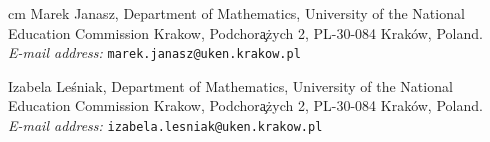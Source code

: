 \documentclass[12pt]{article}
\theoremstyle{plain}
\theoremstyle{definition}
\begin{document}
 cm
\bigskip
Marek Janasz,
Department of Mathematics,
University of the National Education Commission Krakow,
Podchor\c a\.zych 2,
PL-30-084 Krak\'ow, Poland. \\
\nopagebreak
\textit{E-mail address:} \texttt{marek.janasz@uken.krakow.pl}

\bigskip
Izabela Le\'sniak,
Department of Mathematics,
University of the National Education Commission Krakow,
Podchor\c a\.zych 2,
PL-30-084 Krak\'ow, Poland. \\
\nopagebreak
\textit{E-mail address:} \texttt{izabela.lesniak@uken.krakow.pl}
\end{document}
